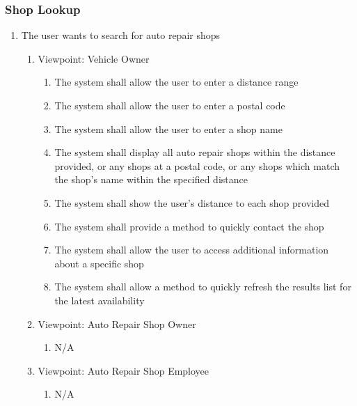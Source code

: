 \documentclass[12pt]{article}
\begin{document}
\subsubsection{Shop Lookup}
\begin{enumerate}[resume*=business_events]
	\item The user wants to search for auto repair shops
	      \begin{enumerate}[VP\arabic*.]
		      \item Viewpoint: Vehicle Owner
		            \begin{enumerate}
			            \item The system shall allow the user to enter a distance range
			            \item The system shall allow the user to enter a postal code
			            \item The system shall allow the user to enter a shop name
			            \item The system shall display all auto repair shops within the distance provided, or any shops at a
			                  postal code, or any shops which match the shop's name within the specified distance
			            \item The system shall show the user's distance to each shop provided
			            \item The system shall provide a method to quickly contact the shop
			            \item The system shall allow the user to access additional information about a specific shop
			            \item The system shall allow a method to quickly refresh the results list for the latest availability
		            \end{enumerate}
		      \item Viewpoint: Auto Repair Shop Owner
		            \begin{enumerate}
			            \item[] N/A
		            \end{enumerate}
		      \item Viewpoint: Auto Repair Shop Employee
		            \begin{enumerate}
			            \item[] N/A
		            \end{enumerate}
	      \end{enumerate}
\end{enumerate}
\end{document}
